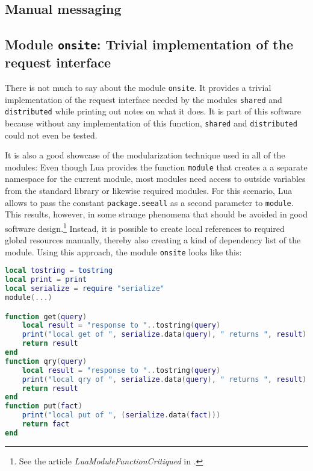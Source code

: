 \begin{appendices}

\chapter{Manual messaging}

\section{Module \texttt{onsite}: Trivial implementation of the request interface}

There is not much to say about the module \texttt{onsite}. It provides a trivial implementation of the request interface needed by the modules \texttt{shared} and \texttt{distributed} while printing out notes on what it does. It is part of this software because without any implementation of this function, \texttt{shared} and \texttt{distributed} could not even be tested.

It is also a good showcase of the modularization technique used in all of the modules: Even though Lua provides the function \texttt{module} that creates a a separate namespace for the current module, most modules need access to outside variables from the standard library or likewise required modules. For this scenario, Lua allows to pass the constant \texttt{package.seeall} as a second parameter to \texttt{module}. This results, however, in some strange phenomena that should be avoided in good software design.\footnote{See the article \emph{LuaModuleFunctionCritiqued} in \cite{LuaUsersWiki}.} Instead, it is possible to create local references to required global resources manually, thereby also creating a kind of dependency list of the module. Using this approach, the module \texttt{onsite} looks like this:

\begin{lstlisting}[language=lua, caption={The module \texttt{onsite}}, label=lst:onsite, name=lst:onsite]
local tostring = tostring
local print = print
local serialize = require "serialize"
module(...)

function get(query)
	local result = "response to "..tostring(query)
	print("local get of ", serialize.data(query), " returns ", result)
	return result
end
function qry(query)
	local result = "response to "..tostring(query)
	print("local qry of ", serialize.data(query), " returns ", result)
	return result
end
function put(fact)
	print("local put of ", (serialize.data(fact)))
	return fact
end
\end{lstlisting}


\end{appendices}
